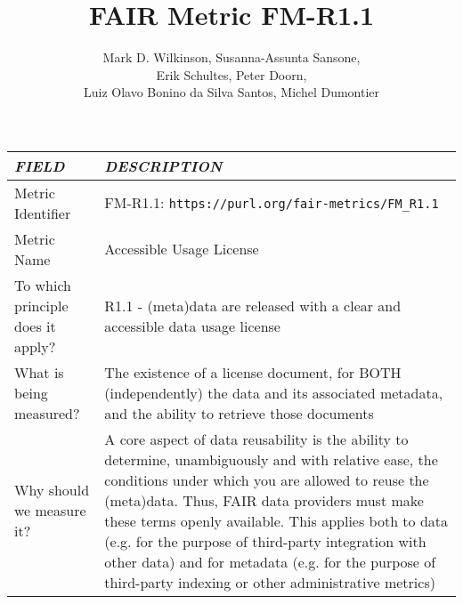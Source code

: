 \documentclass[english]{article}
\begin{document}
\title{FAIR Metric FM-R1.1}

\author{Mark D. Wilkinson, Susanna-Assunta Sansone, \\Erik Schultes, Peter Doorn,\\ 
Luiz Olavo Bonino da Silva Santos, Michel Dumontier}

\maketitle

\newpage





\begin{longtable}{|p{5cm}|p{9cm}|}


\hline
\emph{FIELD} & \emph{DESCRIPTION} \\
\hline
Metric Identifier &   FM-R1.1: \verb"https://purl.org/fair-metrics/FM_R1.1"
\\


\hline
Metric Name &   

Accessible Usage License


 \\



\hline
To which principle does it apply? &   



R1.1 - (meta)data are released with a clear and accessible data usage license

\\



\hline
What is being measured? & 

The existence of a license document, for BOTH (independently) the data and its associated metadata, and the ability to retrieve those documents


\\



\hline
Why should we measure it? & 


A core aspect of data reusability is the ability to determine, unambiguously and with relative ease, the conditions under which you are allowed to reuse the (meta)data.  Thus, FAIR data providers must make these terms openly available.  This applies both to data (e.g. for the purpose of third-party integration with other data) and for metadata (e.g. for the purpose of third-party indexing or other administrative metrics)


\end{longtable}
\end{document}
